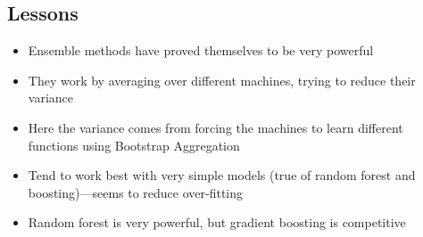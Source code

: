 \begin{slide}
\section{Lessons}

\begin{PauseHighLight}
  \begin{itemize}
  \item Ensemble methods have proved themselves to be very
    powerful\pause
  \item They work by averaging over different machines, trying to
    reduce their variance\pause
  \item Here the variance comes from forcing the machines to learn
    different functions using Bootstrap Aggregation\pause
  \item Tend to work best with very simple models (true of random forest
    and boosting)\pause---seems to reduce over-fitting\pause
  \item Random forest is very powerful, but gradient boosting is competitive\pause
  \end{itemize}
\end{PauseHighLight}

\end{slide}




